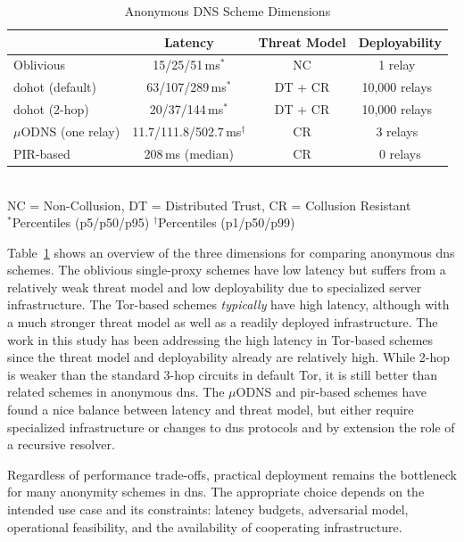 \begin{table}[]
    \begin{minipage}{\textwidth}
    \centering
    \caption{Anonymous DNS Scheme Dimensions}
    \label{tab:eval}
    \begin{tabular}{|l||c|c|c|}
        \hline
        & Latency & Threat Model & Deployability \\
        \hline
        \hline
        Oblivious           & 15/25/51\,ms$^{*}$ & NC & 1 relay~\cite{dnscrypt-commit} \\\hline
        \ac{dohot} (default) & 63/107/289\,ms$^{*}$ & DT + CR & 10,000 relays~\cite{TorMetricsServers} \\\hline
        \ac{dohot} (2-hop)   & 20/37/144\,ms$^{*}$ & DT + CR & 10,000 relays~\cite{TorMetricsServers} \\\hline
        $\mu$ODNS (one relay) & 11.7/111.8/502.7\,ms$^{\dagger}$ & CR & 3 relays~\cite{modns-git} \\\hline
        PIR-based           & 208\,ms (median) & CR & 0 relays \\\hline
    \end{tabular}
    \vspace{.5em}
    \\NC = Non-Collusion, DT = Distributed Trust, CR = Collusion Resistant
    \\$^{*}$Percentiles (p5/p50/p95) $^{\dagger}$Percentiles (p1/p50/p99)
    \end{minipage}
\end{table}


Table~\ref{tab:eval} shows an overview of the three dimensions for comparing
anonymous \ac{dns} schemes. The oblivious single-proxy schemes have low latency
but suffers from a relatively weak threat model and low deployability due to
specialized server infrastructure. The Tor-based schemes \emph{typically} have
high latency, although with a much stronger threat model as well as a readily
deployed infrastructure. The work in this study has been addressing the high
latency in Tor-based schemes since the threat model and deployability already
are relatively high. While 2-hop is weaker than the standard 3-hop circuits in
default Tor, it is still better than related schemes in anonymous \ac{dns}. The
$\mu$ODNS and \ac{pir}-based schemes have found a nice balance between latency
and threat model, but either require specialized infrastructure or changes to
\ac{dns} protocols and by extension the role of a recursive resolver. 

Regardless of performance trade-offs, practical deployment remains the
bottleneck for many anonymity schemes in \ac{dns}. The appropriate choice
depends on the intended use case and its constraints: latency budgets,
adversarial model, operational feasibility, and the availability of cooperating
infrastructure.


